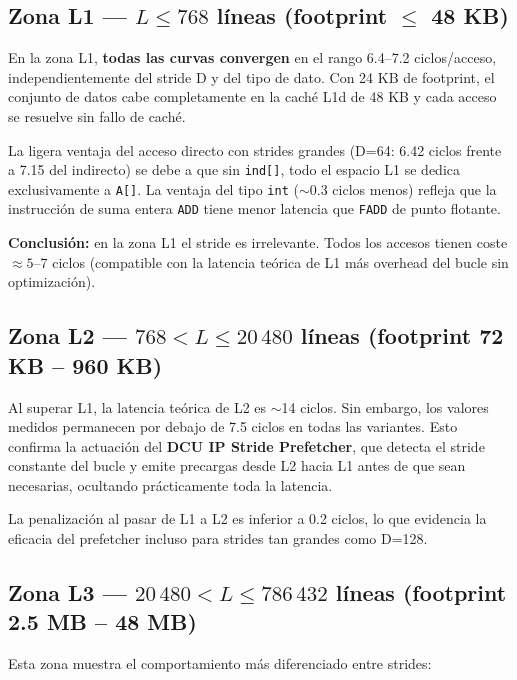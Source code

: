 \documentclass[12pt,a4paper]{article}
\begin{document}
\subsection{Zona L1 — $L \leq 768$ líneas (footprint $\leq$ 48 KB)}

En la zona L1, \textbf{todas las curvas convergen} en el rango 6.4--7.2 ciclos/acceso, independientemente del stride D y del tipo de dato. Con 24 KB de footprint, el conjunto de datos cabe completamente en la caché L1d de 48 KB y cada acceso se resuelve sin fallo de caché.

La ligera ventaja del acceso directo con strides grandes (D=64: 6.42 ciclos frente a 7.15 del indirecto) se debe a que sin \texttt{ind[]}, todo el espacio L1 se dedica exclusivamente a \texttt{A[]}. La ventaja del tipo \texttt{int} ($\sim$0.3 ciclos menos) refleja que la instrucción de suma entera \texttt{ADD} tiene menor latencia que \texttt{FADD} de punto flotante.

\textbf{Conclusión:} en la zona L1 el stride es irrelevante. Todos los accesos tienen coste $\approx 5$--7 ciclos (compatible con la latencia teórica de L1 más overhead del bucle sin optimización).

\subsection{Zona L2 — $768 < L \leq 20\,480$ líneas (footprint 72 KB -- 960 KB)}

Al superar L1, la latencia teórica de L2 es $\sim$14 ciclos. Sin embargo, los valores medidos permanecen por debajo de 7.5 ciclos en todas las variantes. Esto confirma la actuación del \textbf{DCU IP Stride Prefetcher}, que detecta el stride constante del bucle y emite precargas desde L2 hacia L1 antes de que sean necesarias, ocultando prácticamente toda la latencia.

La penalización al pasar de L1 a L2 es inferior a 0.2 ciclos, lo que evidencia la eficacia del prefetcher incluso para strides tan grandes como D=128.

\subsection{Zona L3 — $20\,480 < L \leq 786\,432$ líneas (footprint 2.5 MB -- 48 MB)}

Esta zona muestra el comportamiento más diferenciado entre strides:
\end{document}
